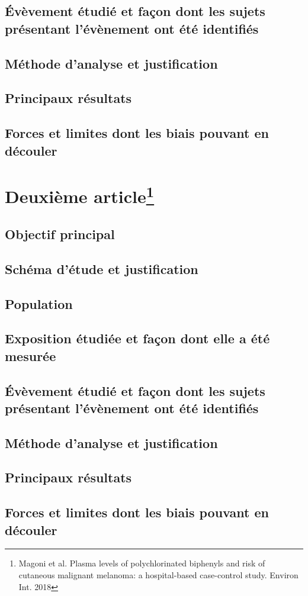 \documentclass[10pt]{article}
\begin{document}
\subsection{\'{E}vèvement étudié et façon dont les sujets présentant l'évènement ont été identifiés}

\subsection{Méthode d'analyse et justification}

\subsection{Principaux résultats}

\subsection{Forces et limites dont les biais pouvant en découler}

\newpage
\section{Deuxième article\protect\footnote{Magoni et al. Plasma levels of polychlorinated biphenyls and risk of cutaneous malignant melanoma: a hospital-based case-control study. Environ Int. 2018}}
\subsection{Objectif principal}

\subsection{Schéma d'étude et justification}

\subsection{Population}

\subsection{Exposition étudiée et façon dont elle a été mesurée}

\subsection{\'{E}vèvement étudié et façon dont les sujets présentant l'évènement ont été identifiés}

\subsection{Méthode d'analyse et justification}

\subsection{Principaux résultats}

\subsection{Forces et limites dont les biais pouvant en découler}
\end{document}
